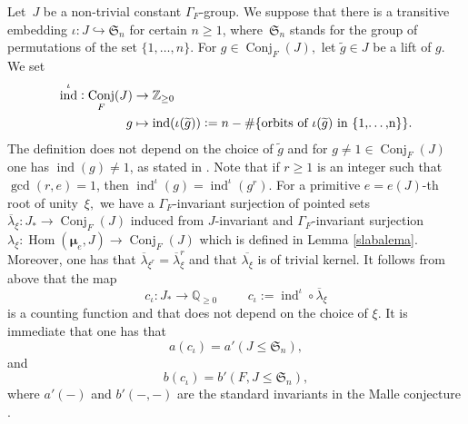 \documentclass[a4paper,english,12pt]{amsart}
\newcommand{\QQ}{\mathbb{Q}}
\newcommand{\ZZ}{\mathbb{Z}}
\newcommand{\doots}{,\dots ,}
\newcommand{\muu}{\boldsymbol{\mu}}
\DeclareMathOperator{\Conj}{Conj}
\DeclareMathOperator{\ind}{ind}
\DeclareMathOperator{\Hom}{Hom}
\DeclareMathOperator{\cycl}{cycl}
\newtheorem{mydef}[equation]{Definition}
\numberwithin{equation}{subsection}
\begin{document}
Let~$J$ be a non-trivial constant $\Gamma_F$-group. We suppose that there is a transitive embedding $\iota:J\hookrightarrow \mathfrak S_n$ for certain $n\geq 1$, where~$\mathfrak S_n$ stands for the group of permutations of the set $\{1\doots n\}$. For $g\in \Conj_F(J),$ let $\widetilde g\in J$ be a lift of $g$. We set
\begin{align*}\ind^{\iota}:\Conj_F(J)&\to\ZZ_{\geq 0}\\g&\mapsto\ind(\iota(\widetilde g)):=n-\# \{\textnormal{orbits of }\iota(\widetilde g)\textnormal{ in \{1\doots n\}}\}.
\end{align*} The definition does not depend on the choice of $\widetilde g$ and for $g\neq 1\in\Conj_F(J)$ one has $\ind(g)\neq 1$, as stated in \cite[Section 2]{Malle}. Note that if $r\geq 1$ is an integer such that $\gcd(r,e)=1$, then $\ind^{\iota} (g)=\ind^{\iota}(g^r)$. For a primitive $e=e(J)$-th root of unity~$\xi,$ we have a $\Gamma_F$-invariant surjection of pointed sets $\overline\lambda_\xi:J_*\to \Conj_F(J)$ induced from $J$-invariant and $\Gamma_F$-invariant surjection $\lambda_\xi:\Hom(\muu_e,J)\to \Conj_F(J)$ which is defined in Lemma \ref{slabalema}. Moreover, one has that $\overline\lambda_{\xi^r}=\overline\lambda_{\xi}^r$ and that $\overline{\lambda_{\xi}}$ is of trivial kernel. It follows from above that the map $$c_{{\iota}}:J_*\to\QQ_{\geq 0}\hspace{1cm}c_{{\iota}}:=\ind^{\iota}\circ\overline{\lambda}_\xi$$ is a counting function and that does not depend on the choice of $\xi$. 
It is immediate that one has that $$a(c_{{\iota}})=a'(J\leq \mathfrak S_n),$$ and $$b(c_{{\iota}})=b'(F,J\leq \mathfrak S_n),$$where $a'(-)$ and $b'(-,-)$ are the standard invariants in the Malle conjecture \cite[Section 2]{Malle}.
\end{document}
